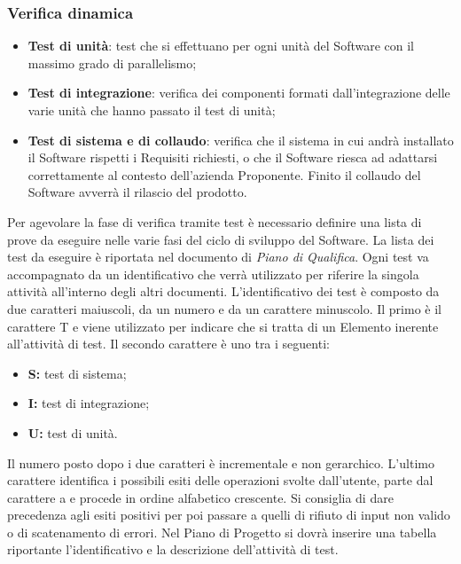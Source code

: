    \subsubsection{Verifica dinamica}  
  	\begin{itemize}
  \item \textbf{Test di unità}: test che si effettuano per ogni unità del Software con il massimo grado di parallelismo;
  \item \textbf{Test di integrazione}: verifica dei componenti formati dall’integrazione delle varie unità che hanno passato il test di unità;
  \item \textbf{Test di sistema e di collaudo}: verifica che il sistema in cui andrà installato il Software rispetti i Requisiti richiesti, o che il Software riesca ad adattarsi correttamente al contesto dell’azienda Proponente. Finito il collaudo del Software avverrà il rilascio del prodotto.
  \end{itemize}
  Per agevolare la fase di verifica tramite test è necessario definire una lista di prove da eseguire nelle varie fasi del ciclo di sviluppo del Software.
  La lista dei test da eseguire è riportata nel documento di \emph{Piano di Qualifica}. Ogni test va accompagnato da un identificativo che verrà utilizzato per riferire
  la singola attività all’interno degli altri documenti.  L’identificativo dei test è composto da due caratteri maiuscoli, da un numero e da un carattere minuscolo. Il primo è il carattere T e viene utilizzato per indicare che si tratta di un Elemento inerente all’attività di test. Il secondo carattere è uno tra i seguenti:
  \begin{itemize} 
  \item \textbf{S:} test di sistema;
  \item \textbf{I:} test di integrazione;
  \item \textbf{U:} test di unità.
  \end{itemize}
  Il numero posto dopo i due caratteri è incrementale e non gerarchico. L’ultimo carattere identifica i possibili esiti delle operazioni svolte dall’utente, parte dal carattere a e procede in ordine alfabetico crescente. Si consiglia di dare precedenza agli esiti positivi per poi passare a quelli di rifiuto di input non valido o di scatenamento di errori.
  Nel Piano di Progetto si dovrà inserire una tabella riportante l’identificativo e la descrizione dell’attività di test.
  
